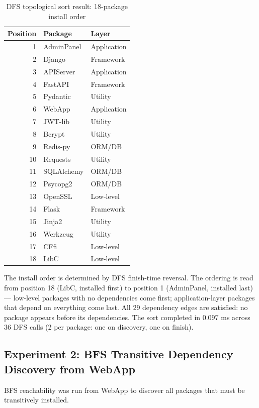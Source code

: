 \documentclass[12pt, a4paper, oneside]{report}
\theoremstyle{definition}
\begin{document}
\begin{table}[H]
\centering
\caption{DFS topological sort result: 18-package install order}
\label{tab:topo_result}
\begin{tabular}{rll}
\toprule
\textbf{Position} & \textbf{Package} & \textbf{Layer} \\
\midrule
1  & AdminPanel  & Application \\
2  & Django      & Framework \\
3  & APIServer   & Application \\
4  & FastAPI     & Framework \\
5  & Pydantic    & Utility \\
6  & WebApp      & Application \\
7  & JWT-lib     & Utility \\
8  & Bcrypt      & Utility \\
9  & Redis-py    & ORM/DB \\
10 & Requests    & Utility \\
11 & SQLAlchemy  & ORM/DB \\
12 & Psycopg2    & ORM/DB \\
13 & OpenSSL     & Low-level \\
14 & Flask       & Framework \\
15 & Jinja2      & Utility \\
16 & Werkzeug    & Utility \\
17 & CFfi        & Low-level \\
18 & LibC        & Low-level \\
\bottomrule
\end{tabular}
\end{table}

The install order is determined by DFS finish-time reversal. The ordering is read from position 18 (LibC, installed first) to position 1 (AdminPanel, installed last) — low-level packages with no dependencies come first; application-layer packages that depend on everything come last. All 29 dependency edges are satisfied: no package appears before its dependencies. The sort completed in 0.097 ms across 36 DFS calls (2 per package: one on discovery, one on finish).

\subsection{Experiment 2: BFS Transitive Dependency Discovery from WebApp}

BFS reachability was run from WebApp to discover all packages that must be transitively installed.
\end{document}
